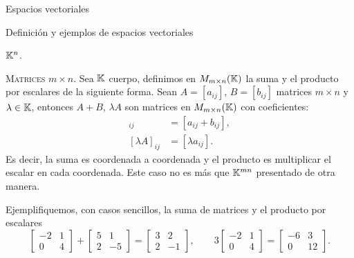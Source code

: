 \begin{chapter}{Espacios vectoriales}
\begin{section}{Definici\'on y ejemplos de espacios vectoriales}
\begin{ejemplo*} {\textsc{$\mathbb K^n$.}}
                
            \end{ejemplo*}
            
            \medspace
            
            \begin{ejemplo*}{\textsc{Matrices $m \times n$.}} Sea $\mathbb K$ cuerpo,  definimos en $M_{m \times n}(\mathbb K)$ la suma  y el producto por escalares de la siguiente forma. Sean $A = [a_{ij}]$, $B = [b_{ij}]$ matrices $m \times n$ y $ \lambda \in \mathbb K$, entonces $A+B$, $\lambda A$ son matrices en $M_{m \times n}(\mathbb K)$ con coeficientes:
                \begin{align*}
                [A + B]_{ij} &= [a_{ij} + b_{ij}], \\
                [\lambda A]_{ij} &= [\lambda a_{ij}]. 
                \end{align*}
                Es decir, la suma es coordenada a coordenada y el producto es multiplicar el escalar en cada coordenada. Este caso no es más que $\mathbb K^{mn}$ presentado de otra manera. 
                
                Ejemplifiquemos, con casos sencillos, la suma de matrices y el producto por escalares
                \begin{equation*}
                \begin{bmatrix} -2&1\\0&4 \end{bmatrix} + \begin{bmatrix} 5&1\\2&-5 \end{bmatrix} =
                \begin{bmatrix} 3&2\\2&-1 \end{bmatrix}, \qquad 
                3\begin{bmatrix} -2&1\\0&4 \end{bmatrix} = \begin{bmatrix} -6&3\\0&12 \end{bmatrix}.
                \end{equation*}	
            \end{ejemplo*}
            
            \medspace
            

\end{section}
\end{chapter}
